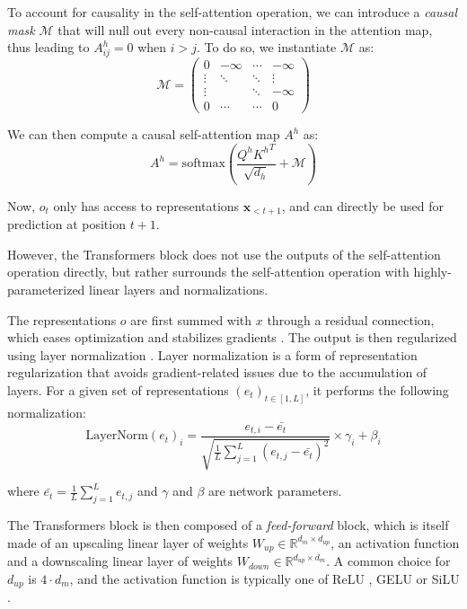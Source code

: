To account for causality in the self-attention operation, we can introduce a \textit{causal mask} $\mathcal{M}$ that will null out every non-causal interaction in the attention map, thus leading to $A^h_{ij} = 0$ when $i > j$. To do so, we instantiate $\mathcal{M}$ as:
\begin{equation*}
    \mathcal{M} = \begin{pmatrix}
        0 & -\infty & \cdots & -\infty \\
        \vdots & \ddots & \ddots & \vdots \\
        \vdots &  & \ddots & -\infty \\
        0 & \cdots & \cdots & 0

    \end{pmatrix}
\end{equation*}

We can then compute a causal self-attention map $A^h$ as:
$$
A^h = \text{softmax} \left(\frac{Q^h {K^h}^T}{\sqrt{d_h}} + \mathcal{M} \right)
$$

Now, $o_t$ only has access to representations $\mathbf{x}_{<t+1}$, and can directly be used for prediction at position $t+1$.

However, the Transformers block does not use the outputs of the self-attention operation directly, but rather surrounds the self-attention operation with highly-parameterized linear layers and normalizations. 

The representations $o$ are first summed with $x$ through a residual connection, which eases optimization and stabilizes gradients \citep{residual_conn}. The output is then regularized using layer normalization \citep{ba2016layernormalization}. Layer normalization is a form of representation regularization that avoids gradient-related issues due to the accumulation of layers. For a given set of representations $(e_t)_{t\in [1, L]}$, it performs the following normalization:
$$
\text{LayerNorm}(e_t)_i = \frac{e_{t, i} - \bar{e_t}}{\sqrt{\frac{1}{L} \sum_{j=1}^{L} (e_{t, j} - \bar{e_t})^2}} \times \gamma_i + \beta_i
$$

where $\bar{e_t}=\frac{1}{L} \sum_{j=1}^{L} e_{t, j}$ and $\gamma$ and $\beta$ are network parameters.

The Transformers block is then composed of a \textit{feed-forward} block, which is itself made of an upscaling linear layer of weights $W_{up} \in \mathbb{R}^{d_m \times d_{up}}$, an activation function and a downscaling linear layer of weights $W_{down} \in \mathbb{R}^{d_{up} \times d_m}$. A common choice for $d_{up}$ is $4 \cdot d_m$, and the activation function is typically one of ReLU \citep{relu}, GELU \citep{hendrycks2023gaussianerrorlinearunits} or SiLU \citep{silu}.

